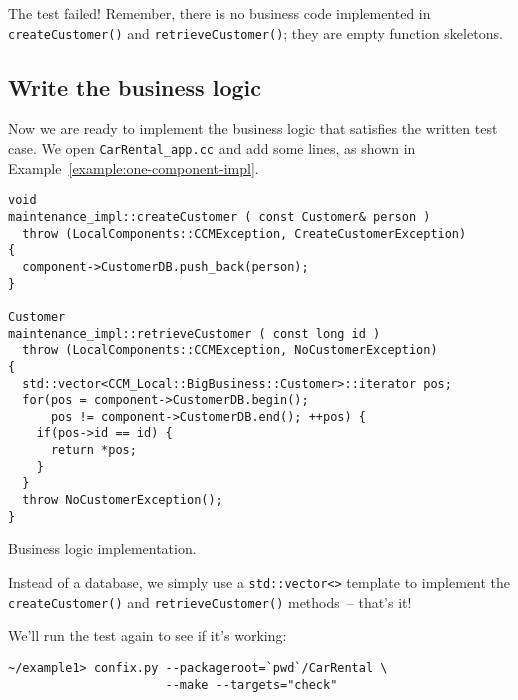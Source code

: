 The test failed!
Remember, there is no business code implemented in {\tt createCustomer()} and 
{\tt retrieveCustomer()}; they are empty function skeletons. 






\subsection{Write the business logic}

Now we are ready to implement the business logic that satisfies the written test
case. We open {\tt CarRental\_app.cc} and add some lines, as shown in
Example~\ref{example:one-component-impl}.

\begin{Example}
\begin{minifbox}
\begin{small}
\begin{verbatim}
void
maintenance_impl::createCustomer ( const Customer& person )
  throw (LocalComponents::CCMException, CreateCustomerException)
{
  component->CustomerDB.push_back(person);
}

Customer
maintenance_impl::retrieveCustomer ( const long id )
  throw (LocalComponents::CCMException, NoCustomerException)
{
  std::vector<CCM_Local::BigBusiness::Customer>::iterator pos;
  for(pos = component->CustomerDB.begin(); 
      pos != component->CustomerDB.end(); ++pos) {
    if(pos->id == id) {
      return *pos;
    }
  }
  throw NoCustomerException();
}
\end{verbatim}
\end{small}
\end{minifbox}
\caption{Business logic implementation.}
\label{example:one-component-impl}
\end{Example}

Instead of a database, we simply use a {\tt std::vector<>} template to implement
the {\tt createCustomer()} and {\tt retrieveCustomer()} methods~-- that's it! 

We'll run the test again to see if it's working:
\begin{small}
\begin{verbatim}
~/example1> confix.py --packageroot=`pwd`/CarRental \
                      --make --targets="check"
\end{verbatim}
\end{small}

